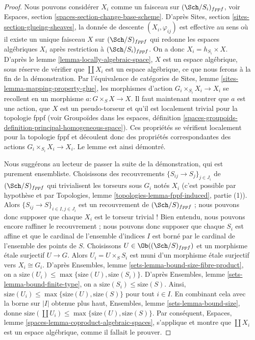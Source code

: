 \begin{proof}
Nous pouvons considérer $X_i$ comme un faisceau sur $(\Sch/S_i)_{fppf}$, voir
Espaces, section \ref{spaces-section-change-base-scheme}.
D'après
Sites, section \ref{sites-section-glueing-sheaves},
la donnée de descente $(X_i, \varphi_{ij})$ est effective au sens où
il existe un unique faisceau $X$ sur $(\Sch/S)_{fppf}$ qui
redonne les espaces algébriques $X_i$ après restriction à
$(\Sch/S_i)_{fppf}$. On a donc
$X_i = h_{S_i} \times X$. D'après le
lemme \ref{lemma-locally-algebraic-space},
$X$ est un espace algébrique, sous réserve de vérifier que $\coprod X_i$
est un espace algébrique, ce que nous ferons à la fin de la démonstration.
Par l'équivalence de catégories de
Sites, lemme \ref{sites-lemma-mapping-property-glue},
les morphismes d'action $G_i \times_{S_i} X_i \to X_i$
se recollent en un morphisme $a : G \times_S X \to X$.
Il faut maintenant montrer que $a$ est une action, que $X$
est un pseudo-torseur et qu'il est localement trivial pour la topologie fppf (voir
Groupoïdes dans les espaces,
définition \ref{spaces-groupoids-definition-principal-homogeneous-space}).
Ces propriétés se vérifient localement pour la topologie fppf et
découlent donc des propriétés correspondantes des actions
$G_i \times_{S_i} X_i \to X_i$. Le lemme est ainsi démontré.

\medskip\noindent
Nous suggérons au lecteur de passer la suite de la démonstration, qui est purement
ensembliste. Choisissons des recouvrements $\{S_{ij} \to S_j\}_{j \in J_i}$ de
$(\Sch/S)_{fppf}$
qui trivialisent les torseurs sous $G_i$ notés $X_i$ (c'est possible par hypothèse et par
Topologies, lemme \ref{topologies-lemma-fppf-induced}, partie (1)).
Alors $\{S_{ij} \to S\}_{i \in I, j \in J_i}$ est un recouvrement de
$(\Sch/S)_{fppf}$ ; nous pouvons donc supposer que chaque $X_i$
est le torseur trivial ! Bien entendu, nous pouvons encore raffiner le recouvrement ;
nous pouvons donc supposer que chaque $S_i$ est affine et que le cardinal de l'ensemble
d'indices $I$ est borné par le cardinal de l'ensemble des points
de $S$. Choisissons $U \in \Ob((\Sch/S)_{fppf})$ et un morphisme
étale surjectif $U \to G$. Alors $U_i = U \times_S S_i$ est muni
d'un morphisme étale surjectif vers $X_i \cong G_i$. D'après
Ensembles, lemme \ref{sets-lemma-bound-size-fibre-product},
on a $\text{size}(U_i) \leq \max\{\text{size}(U), \text{size}(S_i)\}$. D'après
Ensembles, lemme \ref{sets-lemma-bound-finite-type},
on a $\text{size}(S_i) \leq \text{size}(S)$.
Ainsi,
$\text{size}(U_i) \leq \max\{\text{size}(U), \text{size}(S)\}$
pour tout $i \in I$. En combinant cela avec la borne sur $|I|$ obtenue plus haut,
Ensembles, lemme \ref{sets-lemma-bound-size},
donne $\text{size}(\coprod U_i) \leq \max\{\text{size}(U), \text{size}(S)\}$.
Par conséquent,
Espaces, lemme \ref{spaces-lemma-coproduct-algebraic-spaces},
s'applique et montre que $\coprod X_i$ est un espace algébrique, comme
il fallait le prouver.
\end{proof}




